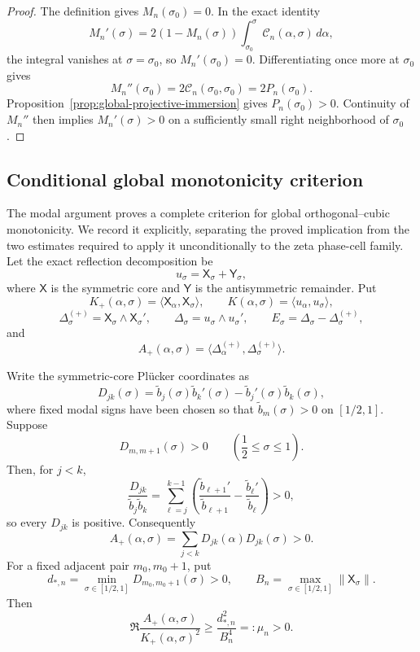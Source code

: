 \documentclass[11pt]{amsart}
\numberwithin{equation}{section}
\begin{document}
\begin{proof}
The definition gives $M_n(\sigma_0)=0$.  In the exact identity
\[
M_n'(\sigma)
=2(1-M_n(\sigma))
\int_{\sigma_0}^{\sigma}\mathcal C_n(\alpha,\sigma)\,d\alpha,
\]
the integral vanishes at $\sigma=\sigma_0$, so
$M_n'(\sigma_0)=0$.  Differentiating once more at $\sigma_0$ gives
\[
M_n''(\sigma_0)
=2\mathcal C_n(\sigma_0,\sigma_0)
=2P_n(\sigma_0).
\]
Proposition~\ref{prop:global-projective-immersion} gives
$P_n(\sigma_0)>0$.  Continuity of $M_n''$ then implies
$M_n'(\sigma)>0$ on a sufficiently small right neighborhood of
$\sigma_0$.
\end{proof}

\subsection{Conditional global monotonicity criterion}

The modal argument proves a complete criterion for global orthogonal--cubic monotonicity. We record it explicitly, separating the proved implication from the two estimates required to apply it unconditionally to the zeta phase-cell family.  Let the exact reflection decomposition be
\[
u_\sigma=\mathsf X_\sigma+\mathsf Y_\sigma,
\]
where $\mathsf X$ is the symmetric core and $\mathsf Y$ is the
antisymmetric remainder.  Put
\[
K_+(\alpha,\sigma)=\langle\mathsf X_\alpha,\mathsf X_\sigma\rangle,
\qquad
K(\alpha,\sigma)=\langle u_\alpha,u_\sigma\rangle,
\]
\[
\Delta_\sigma^{(+)}=\mathsf X_\sigma\wedge\mathsf X_\sigma',
\qquad
\Delta_\sigma=u_\sigma\wedge u_\sigma',
\qquad
E_\sigma=\Delta_\sigma-\Delta_\sigma^{(+)},
\]
and
\[
A_+(\alpha,\sigma)
=\langle\Delta_\alpha^{(+)},\Delta_\sigma^{(+)}\rangle.
\]

Write the symmetric-core Pl\"ucker coordinates as
\[
D_{jk}(\sigma)=\widetilde b_j(\sigma)\widetilde b_k'(\sigma)-\widetilde b_j'(\sigma)\widetilde b_k(\sigma),
\]
where fixed modal signs have been chosen so that $\widetilde b_m(\sigma)>0$ on $[1/2,1]$. Suppose
\begin{equation}
D_{m,m+1}(\sigma)>0
\qquad\left(\frac12\le\sigma\le1\right).
\label{eq:adjacent-chebyshev}
\end{equation}
Then, for $j<k$,
\[
\frac{D_{jk}}{\widetilde b_j\widetilde b_k}
=\sum_{\ell=j}^{k-1}\left(
\frac{\widetilde b_{\ell+1}'}{\widetilde b_{\ell+1}}-
\frac{\widetilde b_{\ell}'}{\widetilde b_{\ell}}\right)>0,
\]
so every $D_{jk}$ is positive. Consequently
\[
A_+(\alpha,\sigma)=\sum_{j<k}D_{jk}(\alpha)D_{jk}(\sigma)>0.
\]
For a fixed adjacent pair $m_0,m_0+1$, put
\[
d_{*,n}=\min_{\sigma\in[1/2,1]}D_{m_0,m_0+1}(\sigma)>0,
\qquad
B_n=\max_{\sigma\in[1/2,1]}\|\mathsf X_\sigma\|.
\]
Then
\begin{equation}
\boxed{
\Re\frac{A_+(\alpha,\sigma)}{K_+(\alpha,\sigma)^2}
\ge\frac{d_{*,n}^2}{B_n^4}=: \mu_n>0.
}
\label{eq:mu-core}
\end{equation}
\end{document}
